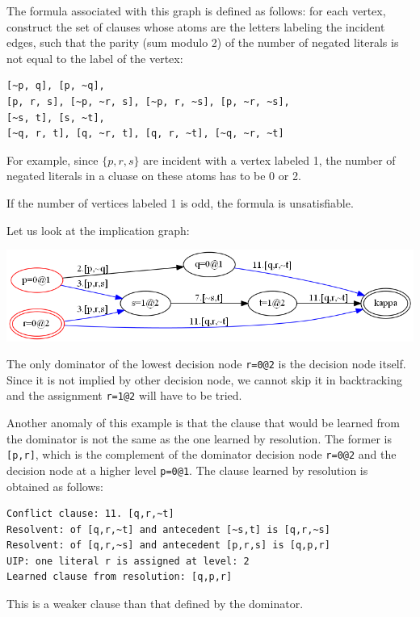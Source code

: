 \documentclass[11pt]{report}
\begin{document}
The formula associated with this graph is defined as follows: for each vertex, construct the set of clauses whose atoms are the letters labeling the incident edges, such that the parity (sum modulo 2) of the number of negated literals is not equal to the label of the vertex:

\begin{verbatim}
[~p, q], [p, ~q],
[p, r, s], [~p, ~r, s], [~p, r, ~s], [p, ~r, ~s],
[~s, t], [s, ~t],
[~q, r, t], [q, ~r, t], [q, r, ~t], [~q, ~r, ~t]
\end{verbatim}

For example, since $\{p, r, s\}$ are incident with a vertex labeled 1, the number of negated literals in a cluase on these atoms has to be 0 or 2.

If the number of vertices labeled 1 is odd, the formula is unsatisfiable.

Let us look at the implication graph:

\begin{center}
\includegraphics[keepaspectratio=true,width=\textwidth]{tseitin-ex-color}
\end{center}

The only dominator of the lowest decision node \verb+r=0@2+ is
the decision node itself. Since it is not implied by other decision
node, we cannot skip it in backtracking and the assignment \verb+r=1@2+
will have to be tried.

Another anomaly of this example is that the clause that would be learned
from the dominator is not the same as the one learned by resolution. The
former is \verb+[p,r]+, which is the complement of the dominator
decision node \verb+r=0@2+ and the decision node at a higher level
\verb+p=0@1+. The clause learned by resolution is obtained as follows:

\begin{verbatim}
Conflict clause: 11. [q,r,~t]
Resolvent: of [q,r,~t] and antecedent [~s,t] is [q,r,~s]
Resolvent: of [q,r,~s] and antecedent [p,r,s] is [q,p,r]
UIP: one literal r is assigned at level: 2
Learned clause from resolution: [q,p,r]
\end{verbatim}

This is a weaker clause than that defined by the dominator.
\end{document}
